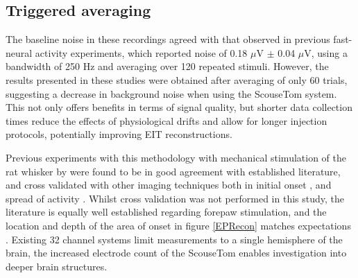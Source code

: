 \subsection{Triggered averaging}
The baseline noise in these recordings agreed with that observed in previous fast-neural activity experiments, which reported noise of 0.18 $\mu$V $\pm$ 0.04 $\mu$V, using a bandwidth of 250 Hz \cite{Oh2011,Packham2016} and averaging over 120 repeated stimuli. However, the results presented in these studies were obtained after averaging of only 60 trials, suggesting a decrease in background noise when using the ScouseTom system. This not only offers benefits in terms of signal quality, but shorter data collection times reduce the effects of physiological drifts and allow for longer injection protocols, potentially improving EIT reconstructions.  

Previous experiments with this methodology with mechanical stimulation of the rat whisker by \citet{Aristovich_2016} were found to be in good agreement with established literature, and cross validated with other imaging techniques both in initial onset \cite{armstrong1991thalamo}, and spread of activity \cite{petersen2007functional}. Whilst cross validation was not performed in this study, the literature is equally well established regarding forepaw stimulation, and the location and depth of the area of onset in figure \ref{EPRecon} matches expectations \cite{peeters2001comparing} \cite{masamoto2007relationship} \cite{lowe2007small}. Existing 32 channel systems limit measurements to a single hemisphere of the brain, the increased electrode count of the ScouseTom enables investigation into deeper brain structures. 
